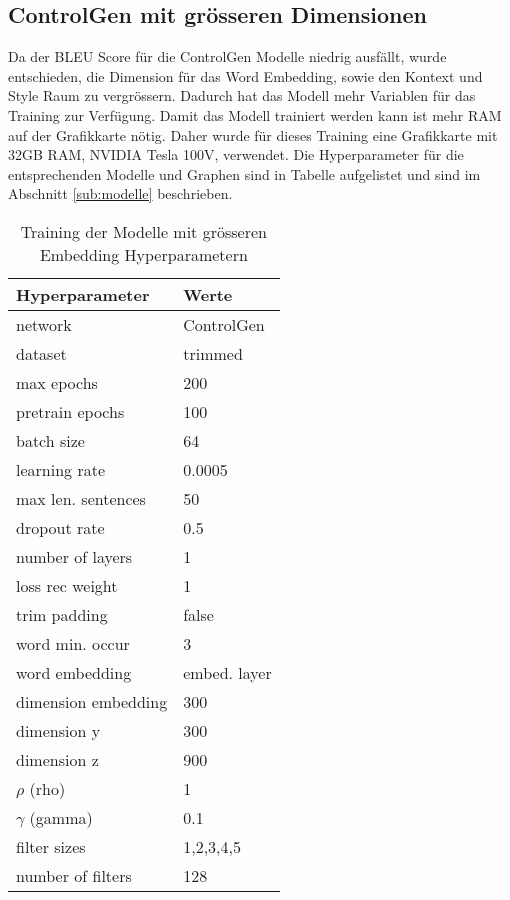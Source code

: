 \newpage

\subsection{ControlGen mit grösseren Dimensionen}
\label{sub:bigger_embedding_hyperparameter}

Da der \gls{BLEU} Score für die ControlGen Modelle niedrig ausfällt, wurde entschieden, die Dimension für das Word
Embedding, sowie den Kontext und Style Raum zu vergrössern. Dadurch hat das Modell mehr Variablen für das Training zur
Verfügung. Damit das Modell trainiert werden kann ist mehr \gls{RAM} auf der Grafikkarte nötig. Daher wurde für dieses
Training eine Grafikkarte mit 32GB \gls{RAM}, NVIDIA Tesla 100V, verwendet. Die Hyperparameter für die entsprechenden
Modelle und Graphen sind in Tabelle  aufgelistet und sind im
Abschnitt \ref{sub:modelle} beschrieben.
\begin{table}[ht]
	\centering
	\begin{tabular}{|l|l|}
    \hline
    \textbf{Hyperparameter} &
    \textbf{Werte} \\
    \hline
    network  & ControlGen \\
    \hline
    dataset  & trimmed \\
    \hline
    max epochs & 200 \\
    \hline
    pretrain epochs & 100 \\
    \hline
    batch size & 64 \\
    \hline
    learning rate & 0.0005 \\
    \hline
    max len. sentences & 50 \\
    \hline
    dropout rate & 0.5 \\
    \hline
    number of layers & 1 \\
    \hline
    loss rec weight & 1 \\
    \hline
    trim padding & false \\
    \hline
    word min. occur & 3 \\
    \hline
    word embedding & embed. layer \\
    \hline
    dimension embedding & 300 \\
    \hline
    dimension y & 300 \\
    \hline
    dimension z & 900 \\
    \hline
    $\rho$ (rho) & 1 \\
    \hline
    $\gamma$ (gamma) & 0.1 \\
    \hline
    filter sizes & 1,2,3,4,5 \\
    \hline
    number of filters & 128 \\
    \hline
    \end{tabular}
	\caption{Training der Modelle mit grösseren Embedding Hyperparametern}
	\label{tab:training_big_embedding_hyperparameter}
\end{table}

